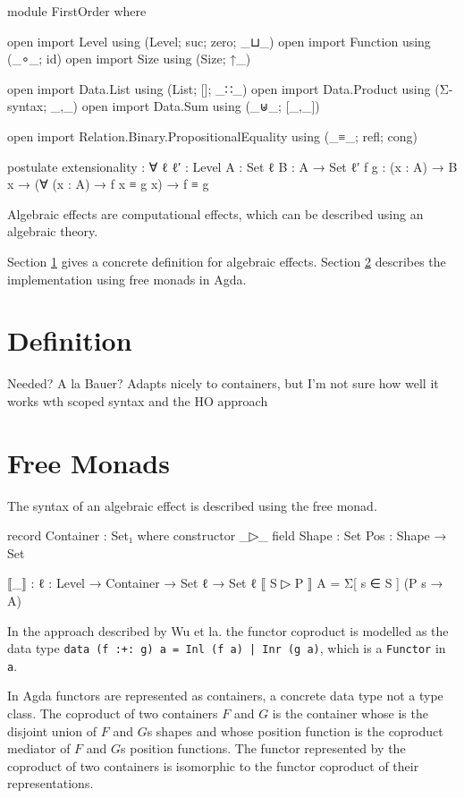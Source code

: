 \begin{code}[hide]
module FirstOrder where

open import Level using (Level; suc; zero; _⊔_)
open import Function using (_∘_; id)
open import Size using (Size; ↑_)

open import Data.List using (List; []; _∷_)
open import Data.Product using (Σ-syntax; _,_)
open import Data.Sum using (_⊎_; [_,_])

open import Relation.Binary.PropositionalEquality using (_≡_; refl; cong)

postulate
  extensionality : ∀ {ℓ ℓ′ : Level} {A : Set ℓ} {B : A → Set ℓ′} {f g : (x : A) → B x}
      → (∀ (x : A) → f x ≡ g x) → f ≡ g
\end{code}

Algebraic effects are computational effects, which can be described using an
algebraic theory.

Section \ref{fo-definition} gives a concrete definition for algebraic effects.
Section \ref{fo-free-monads} describes the implementation using free monads in
Agda.

\section{Definition}
\label{fo-definition}

Needed? A la Bauer? Adapts nicely to containers, but I'm not sure how well it
works wth scoped syntax and the HO approach

\section{Free Monads}
\label{fo-free-monads}

The syntax of an algebraic effect is described using the free monad.

\begin{code}
record Container : Set₁ where
  constructor _▷_
  field
    Shape : Set
    Pos : Shape → Set

⟦_⟧ : {ℓ : Level} → Container → Set ℓ → Set ℓ
⟦ S ▷ P ⟧ A = Σ[ s ∈ S ] (P s → A)
\end{code}
In the approach described by Wu et la. the functor coproduct is modelled
as the data type \texttt{data (f :+: g) a = Inl (f a) | Inr (g a)}, which is a
\texttt{Functor} in \texttt{a}.

In Agda functors are represented as containers, a concrete data type not a type
class.
The coproduct of two containers $F$ and $G$ is the container whose
 is the disjoint union of $F$ and $G$s shapes and whose
position function  is the coproduct mediator of $F$ and $G$s
position functions.
The functor represented by the coproduct of two containers is isomorphic to the
functor coproduct of their representations.

